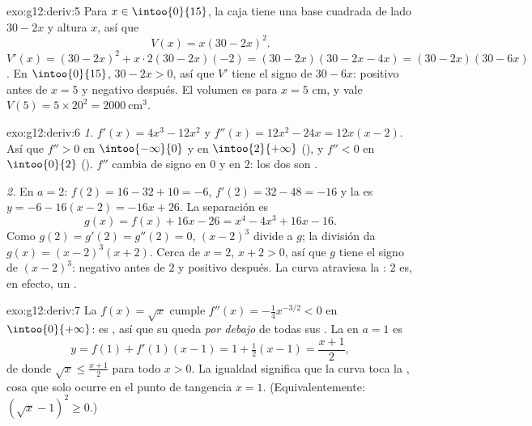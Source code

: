 \begin{solution}{exo:g12:deriv:5}
Para $x \in \intoo{0}{15}$, la caja tiene una base cuadrada de lado
$30 - 2x$ y altura $x$, así que
\[
V(x) = x(30 - 2x)^2 .
\]
$V'(x) = (30-2x)^2 + x \cdot 2(30-2x)(-2) = (30-2x)(30 - 2x - 4x)
= (30-2x)(30-6x)$. En $\intoo{0}{15}$, $30 - 2x > 0$, así que $V'$ tiene el
signo de $30 - 6x$: positivo antes de $x = 5$ y negativo después. El
volumen es  para $x = 5$ cm, y vale
$V(5) = 5 \times 20^2 = 2000\ \text{cm}^3$.
\end{solution}

\begin{solution}{exo:g12:deriv:6}
\emph{1.} $f'(x) = 4x^3 - 12x^2$ y $f''(x) = 12x^2 - 24x = 12x(x-2)$. Así
que $f'' > 0$ en $\intoo{-\infty}{0}$ y en $\intoo{2}{+\infty}$ (),
y $f'' < 0$ en $\intoo{0}{2}$ (). $f''$ cambia de signo en $0$ y en
$2$: los dos son .

\emph{2.} En $a = 2$: $f(2) = 16 - 32 + 10 = -6$, $f'(2) = 32 - 48 = -16$ y
la  es $y = -6 - 16(x-2) = -16x + 26$. La separación es
\[
g(x) = f(x) + 16x - 26 = x^4 - 4x^3 + 16x - 16 .
\]
Como $g(2) = g'(2) = g''(2) = 0$, $(x-2)^3$ divide a $g$; la división da
$g(x) = (x-2)^3(x+2)$. Cerca de $x = 2$, $x + 2 > 0$, así que $g$ tiene el
signo de $(x-2)^3$: negativo antes de $2$ y positivo después. La curva
atraviesa la : $2$ es, en efecto, un .
\end{solution}

\begin{solution}{exo:g12:deriv:7}
La  $f(x) = \sqrt{x}$ cumple $f''(x) = -\frac{1}{4}x^{-3/2} < 0$ en
$\intoo{0}{+\infty}$: es , así que su  queda \emph{por
debajo} de todas sus . La  en $a = 1$ es
\[
y = f(1) + f'(1)(x - 1) = 1 + \tfrac12 (x-1) = \frac{x+1}{2},
\]
de donde $\sqrt{x} \leq \frac{x+1}{2}$ para todo $x > 0$. La igualdad
significa que la curva toca la , cosa que solo ocurre en el punto
de tangencia $x = 1$. (Equivalentemente:
$\left(\sqrt x - 1\right)^2 \geq 0$.)
\end{solution}

